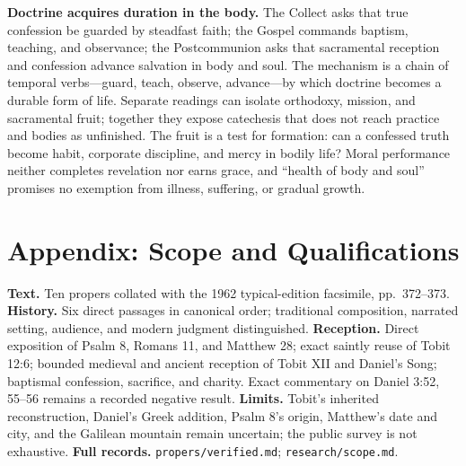 \begin{deepstudy}
\noindent\textbf{Doctrine acquires duration in the body.\enspace{}}
The Collect asks that true confession be guarded by steadfast faith; the Gospel commands baptism, teaching, and observance; the Postcommunion asks that sacramental reception and confession advance salvation in body and soul. The mechanism is a chain of temporal verbs---guard, teach, observe, advance---by which doctrine becomes a durable form of life. Separate readings can isolate orthodoxy, mission, and sacramental fruit; together they expose catechesis that does not reach practice and bodies as unfinished. The fruit is a test for formation: can a confessed truth become habit, corporate discipline, and mercy in bodily life? Moral performance neither completes revelation nor earns grace, and ``health of body and soul'' promises no exemption from illness, suffering, or gradual growth.


\section*{Appendix: Scope and Qualifications}

\begin{studyframe}
\textbf{Text.} Ten propers collated with the 1962 typical-edition facsimile, pp.~372--373. \textbf{History.} Six direct passages in canonical order; traditional composition, narrated setting, audience, and modern judgment distinguished. \textbf{Reception.} Direct exposition of Psalm 8, Romans 11, and Matthew 28; exact saintly reuse of Tobit 12:6; bounded medieval and ancient reception of Tobit XII and Daniel's Song; baptismal confession, sacrifice, and charity. Exact commentary on Daniel 3:52, 55--56 remains a recorded negative result. \textbf{Limits.} Tobit's inherited reconstruction, Daniel's Greek addition, Psalm 8's origin, Matthew's date and city, and the Galilean mountain remain uncertain; the public survey is not exhaustive. \textbf{Full records.} \nolinkurl{propers/verified.md}; \nolinkurl{research/scope.md}.
\end{studyframe}


\end{deepstudy}
